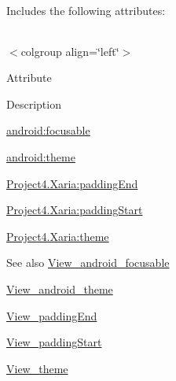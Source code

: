 Includes the following attributes\+:

\tabulinesep=1mm
\begin{longtabu} spread 0pt [c]{*{0}{|X[-1]}|}
\hline
\end{longtabu}
$<$colgroup align=\char`\"{}left\char`\"{}$>$ 

Attribute

Description 

{\ttfamily \hyperlink{classproject4_1_1xaria_1_1R_1_1styleable_a8789b40250f5591b39eb29d5049ef3a4}{android\+:focusable}}

{\ttfamily \hyperlink{classproject4_1_1xaria_1_1R_1_1styleable_af98caf79414987ddefaf5c9675bb0e64}{android\+:theme}}

{\ttfamily \hyperlink{classproject4_1_1xaria_1_1R_1_1styleable_a5fcfb70d1e2f153ceb31eb7dfb763f57}{Project4.\+Xaria\+:padding\+End}}

{\ttfamily \hyperlink{classproject4_1_1xaria_1_1R_1_1styleable_a82fdb93ccc6551d224d5777d9f449770}{Project4.\+Xaria\+:padding\+Start}}

{\ttfamily \hyperlink{classproject4_1_1xaria_1_1R_1_1styleable_a1d278e0c69dd3ae9a0e88dac09d952c1}{Project4.\+Xaria\+:theme}}

\begin{DoxySeeAlso}{See also}
\hyperlink{classproject4_1_1xaria_1_1R_1_1styleable_a8789b40250f5591b39eb29d5049ef3a4}{View\+\_\+android\+\_\+focusable} 

\hyperlink{classproject4_1_1xaria_1_1R_1_1styleable_af98caf79414987ddefaf5c9675bb0e64}{View\+\_\+android\+\_\+theme} 

\hyperlink{classproject4_1_1xaria_1_1R_1_1styleable_a5fcfb70d1e2f153ceb31eb7dfb763f57}{View\+\_\+padding\+End} 

\hyperlink{classproject4_1_1xaria_1_1R_1_1styleable_a82fdb93ccc6551d224d5777d9f449770}{View\+\_\+padding\+Start} 

\hyperlink{classproject4_1_1xaria_1_1R_1_1styleable_a1d278e0c69dd3ae9a0e88dac09d952c1}{View\+\_\+theme} 
\end{DoxySeeAlso}
\mbox{\label{classproject4_1_1xaria_1_1R_1_1styleable_a8789b40250f5591b39eb29d5049ef3a4}} 
